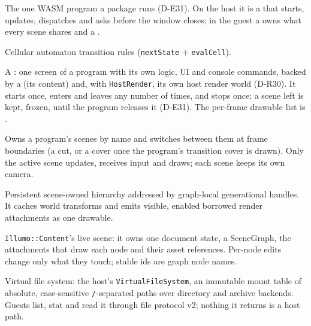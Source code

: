 \begin{description}[style=nextline, leftmargin=0pt]
  \item[Program]
    The one WASM program a package runs (D-E31). On the host it is a
     that  starts, updates,
    dispatches and asks before the window closes; in the guest a
     owns what every scene shares and a
    .
  \item[RuleSet]
    Cellular automaton transition rules (\texttt{nextState} + \texttt{evalCell}).
  \item[Scene (program scene)]
    A : one screen of a program with its own logic, UI
    and console commands, backed by a  (its content)
    and, with \texttt{HostRender}, its own host render world (D-R30). It
    starts once, enters and leaves any number of times, and stops once; a
    scene left is kept, frozen, until the program releases it (D-E31). The
    per-frame drawable list is .
  \item[SceneDirector]
    Owns a program's scenes by name and switches between them at frame
    boundaries (a cut, or a cover once the program's transition cover is
    drawn). Only the active scene updates, receives input and draws; each
    scene keeps its own camera.
  \item[SceneGraph]
    Persistent scene-owned hierarchy addressed by graph-local generational
    handles. It caches world transforms and emits visible, enabled borrowed
    render attachments as one  drawable.
  \item[SceneInstance]
    \texttt{Illumo::Content}'s live scene: it owns one document state, a
    SceneGraph, the attachments that draw each node and their asset
    references. Per-node edits change only what they touch; stable ids are
    graph node names.
  \item[VFS]
    Virtual file system: the host's \texttt{VirtualFileSystem}, an immutable
    mount table of absolute, case-sensitive \texttt{/}-separated paths over
    directory and archive backends. Guests list, stat and read it through
    file protocol v2; nothing it returns is a host path.
\end{description}

